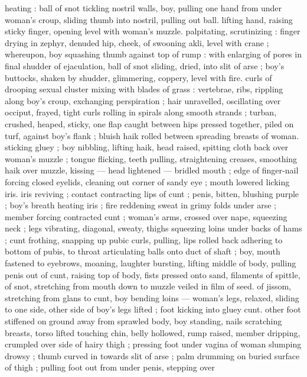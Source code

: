 heating : ball of snot tickling nostril walls, boy, pulling one hand from 
under woman's croup, sliding thumb into nostril, pulling out ball. 
lifting hand, raising sticky finger, opening level with woman's muzzle. 
palpitating, scrutinizing : finger drying in zephyr, denuded hip, 
cheek, of swooning akli, level with crane ; whereupon, boy squashing 
thumb against top of rump : with enlarging of pores in final shudder 
of ejaculation, ball of snot sliding, dried, into slit of arse ; boy's 
buttocks, shaken by shudder, glimmering, coppery, level with fire. 
curls of drooping sexual cluster mixing with blades of grass : 
vertebrae, ribs, rippling along boy's croup, exchanging perspiration 
; hair unravelled, oscillating over occiput, frayed, tight curls rolling in 
spirals along smooth strands ; turban, crushed, heaped, sticky, one 
flap caught between hips pressed together, piled on turf, against 
boy's flank ; bluish haik rolled between spreading breasts of woman. 
sticking gluey ; boy nibbling, lifting haik, head raised, spitting cloth 
back over woman's muzzle ; tongue flicking, teeth pulling, 
straightening creases, smoothing haik over muzzle, kissing --- head 
lightened --- bridled mouth ; edge of finger-nail forcing closed 
eyelids, cleaning out corner of sandy eye ; mouth lowered licking iris. 
iris reviving ; contact contracting lips of cunt ; penis, bitten, blushing 
purple ; boy's breath heating iris ; fire reddening sweat in grimy folds 
under arse ; member forcing contracted cunt ; woman's arms, 
crossed over nape, squeezing neck ; legs vibrating, diagonal, sweaty, 
thighs squeezing loins under backs of hams ; cunt frothing, snapping 
up pubic curls, pulling, lips rolled back adhering to bottom of pubis, 
to throat articulating balls onto duct of shaft ; boy, mouth fastened 
to eyebrows, moaning, laughter bursting, lifting middle of body, 
pulling penis out of cunt, raising top of body, fists pressed onto 
sand, filaments of spittle, of snot, stretching from mouth down to 
muzzle veiled in film of seed. of jissom, stretching from glans to 
cunt, boy bending loins --- woman's legs, relaxed, sliding to one 
side, other side of boy's legs lifted ; foot kicking into gluey cunt. 
other foot stiffened on ground away from sprawled body, boy 
standing, nails scratching breasts, torso lifted touching chin, belly 
hollowed, rump raised, member dripping, crumpled over side of 
hairy thigh ; pressing foot under vagina of woman slumping drowsy 
; thumb curved in towards slit of arse ; palm drumming on buried 
surface of thigh ; pulling foot out from under penis, stepping over 

